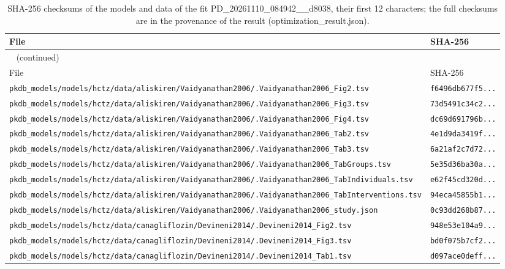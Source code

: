 \begin{longtable}{ll}
\caption{SHA-256 checksums of the models and data of the fit PD\_20261110\_084942\_\_d8038, their first 12 characters; the full checksums are in the provenance of the result (optimization\_result.json).}\label{tab:checksums:PD_20261110_084942__d8038} \\
\toprule
File & SHA-256 \\
\midrule
\endfirsthead
\multicolumn{2}{l}{\small\tablename~\thetable{} (continued)} \\
\toprule
File & SHA-256 \\
\midrule
\endhead
\bottomrule
\endlastfoot
\texttt{pkdb\_models/models/hctz/data/aliskiren/Vaidyanathan2006/.Vaidyanathan2006\_Fig2.tsv} & \texttt{f6496db677f5...} \\
\texttt{pkdb\_models/models/hctz/data/aliskiren/Vaidyanathan2006/.Vaidyanathan2006\_Fig3.tsv} & \texttt{73d5491c34c2...} \\
\texttt{pkdb\_models/models/hctz/data/aliskiren/Vaidyanathan2006/.Vaidyanathan2006\_Fig4.tsv} & \texttt{dc69d691796b...} \\
\texttt{pkdb\_models/models/hctz/data/aliskiren/Vaidyanathan2006/.Vaidyanathan2006\_Tab2.tsv} & \texttt{4e1d9da3419f...} \\
\texttt{pkdb\_models/models/hctz/data/aliskiren/Vaidyanathan2006/.Vaidyanathan2006\_Tab3.tsv} & \texttt{6a21af2c7d72...} \\
\texttt{pkdb\_models/models/hctz/data/aliskiren/Vaidyanathan2006/.Vaidyanathan2006\_TabGroups.tsv} & \texttt{5e35d36ba30a...} \\
\texttt{pkdb\_models/models/hctz/data/aliskiren/Vaidyanathan2006/.Vaidyanathan2006\_TabIndividuals.tsv} & \texttt{e62f45cd320d...} \\
\texttt{pkdb\_models/models/hctz/data/aliskiren/Vaidyanathan2006/.Vaidyanathan2006\_TabInterventions.tsv} & \texttt{94eca45855b1...} \\
\texttt{pkdb\_models/models/hctz/data/aliskiren/Vaidyanathan2006/.Vaidyanathan2006\_study.json} & \texttt{0c93dd268b87...} \\
\texttt{pkdb\_models/models/hctz/data/canagliflozin/Devineni2014/.Devineni2014\_Fig2.tsv} & \texttt{948e53e104a9...} \\
\texttt{pkdb\_models/models/hctz/data/canagliflozin/Devineni2014/.Devineni2014\_Fig3.tsv} & \texttt{bd0f075b7cf2...} \\
\texttt{pkdb\_models/models/hctz/data/canagliflozin/Devineni2014/.Devineni2014\_Tab1.tsv} & \texttt{d097ace0deff...} \\

\end{longtable}
